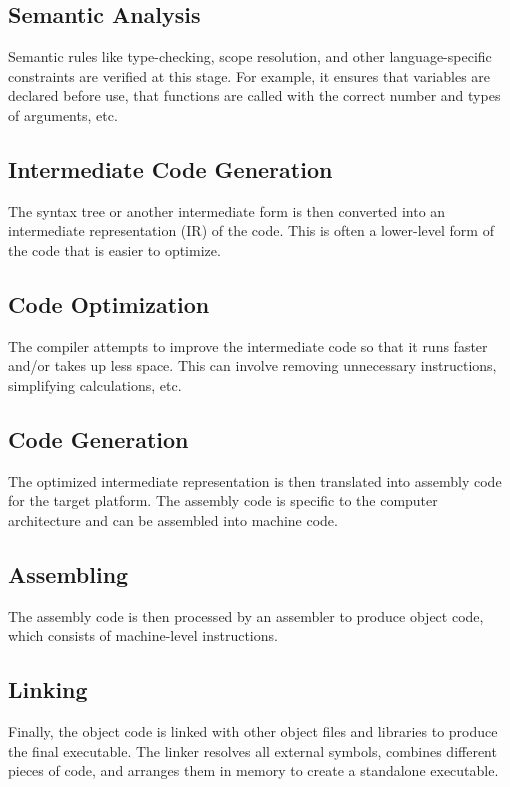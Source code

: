 \documentclass{report}
\begin{document}
    \bigbreak \noindent 
    \subsection{Semantic Analysis}
    \bigbreak \noindent 
    Semantic rules like type-checking, scope resolution, and other language-specific constraints are verified at this stage. For example, it ensures that variables are declared before use, that functions are called with the correct number and types of arguments, etc.

    \bigbreak \noindent 
    \subsection{Intermediate Code Generation}
    \bigbreak \noindent 
    The syntax tree or another intermediate form is then converted into an intermediate representation (IR) of the code. This is often a lower-level form of the code that is easier to optimize.

    \bigbreak \noindent 
    \subsection{Code Optimization}
    \bigbreak \noindent 
    The compiler attempts to improve the intermediate code so that it runs faster and/or takes up less space. This can involve removing unnecessary instructions, simplifying calculations, etc.

    \bigbreak \noindent 
    \subsection{Code Generation}
    \bigbreak \noindent 
    The optimized intermediate representation is then translated into assembly code for the target platform. The assembly code is specific to the computer architecture and can be assembled into machine code.

    \bigbreak \noindent 
    \subsection{Assembling}
    \bigbreak \noindent 
    The assembly code is then processed by an assembler to produce object code, which consists of machine-level instructions.

    \bigbreak \noindent 
    \subsection{Linking}
    \bigbreak \noindent 
    Finally, the object code is linked with other object files and libraries to produce the final executable. The linker resolves all external symbols, combines different pieces of code, and arranges them in memory to create a standalone executable.
\end{document}
